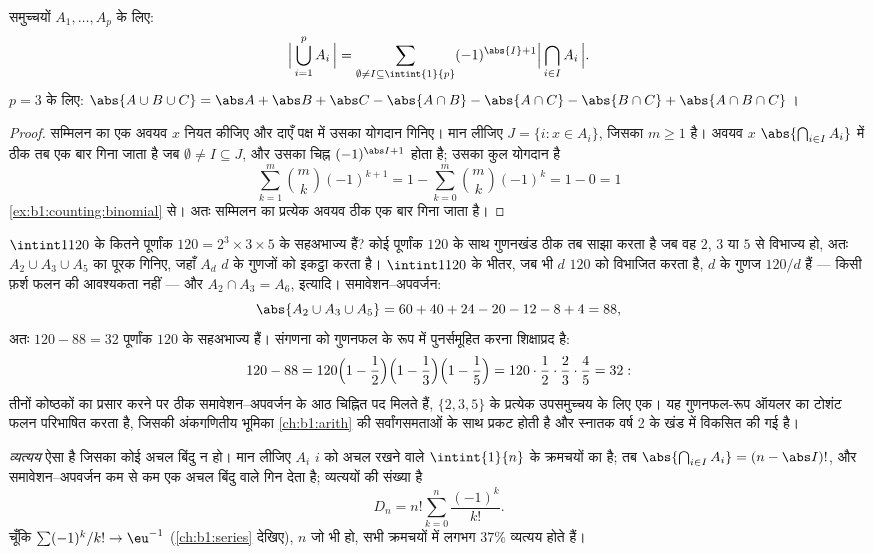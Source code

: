 \begin{theorem}[समावेशन--अपवर्जन]\label{thm:b1:counting:inclexcl}
 समुच्चयों $A_1, \dots, A_p$ के लिए:
\[
\Bigl|\, \bigcup_{i=1}^{p} A_i \,\Bigr|
= \sum_{\emptyset \neq I \subseteq \intint{1}{p}}
(-1)^{\abs{I}+1} \Bigl|\, \bigcap_{i \in I} A_i \,\Bigr| .
\]
$p = 3$ के लिए: $\abs{A \cup B \cup C} = \abs A + \abs B + \abs C - \abs{A
\cap B} - \abs{A \cap C} - \abs{B \cap C} + \abs{A \cap B \cap C}$।
\end{theorem}

\begin{proof}
सम्मिलन का एक अवयव $x$ नियत कीजिए और दाएँ पक्ष में उसका योगदान गिनिए। मान
लीजिए $J = \{i : x \in A_i\}$, जिसका  $m \geq 1$ है। अवयव $x$
$\abs{\bigcap_{i \in I} A_i}$ में ठीक तब एक बार गिना जाता है जब $\emptyset
\neq I \subseteq J$, और उसका चिह्न $(-1)^{\abs I + 1}$ होता है; उसका कुल
योगदान है
\[
\sum_{k=1}^{m} \binom{m}{k} (-1)^{k+1}
= 1 - \sum_{k=0}^{m} \binom mk (-1)^k = 1 - 0 = 1
\]
\cref{ex:b1:counting:binomial} से। अतः सम्मिलन का प्रत्येक अवयव ठीक एक बार
गिना जाता है।
\end{proof}

\begin{example}\label{ex:b1:counting:coprime}
$\intint1{120}$ के कितने पूर्णांक $120 = 2^3 \times 3 \times 5$ के सहअभाज्य
हैं? कोई पूर्णांक $120$ के साथ गुणनखंड ठीक तब साझा करता है जब वह $2$, $3$ या
$5$ से विभाज्य हो, अतः $A_2 \cup A_3 \cup A_5$ का पूरक गिनिए, जहाँ $A_d$ $d$
के गुणजों को इकट्ठा करता है। $\intint1{120}$ के भीतर, जब भी $d$ $120$ को
विभाजित करता है, $d$ के गुणज $120/d$ हैं --- किसी फ़र्श फलन की आवश्यकता नहीं
--- और $A_2 \cap A_3 = A_6$, इत्यादि। समावेशन--अपवर्जन:
\[
\abs{A_2 \cup A_3 \cup A_5}
= 60 + 40 + 24 - 20 - 12 - 8 + 4 = 88 ,
\]
अतः $120 - 88 = 32$ पूर्णांक $120$ के सहअभाज्य हैं। संगणना को गुणनफल के रूप
में पुनर्समूहित करना शिक्षाप्रद है:
\[
120 - 88 = 120\Bigl(1 - \frac12\Bigr)\Bigl(1 -
\frac13\Bigr)\Bigl(1 - \frac15\Bigr) = 120 \cdot \frac12 \cdot
\frac23 \cdot \frac45 = 32 :
\]
तीनों कोष्ठकों का प्रसार करने पर ठीक समावेशन--अपवर्जन के आठ चिह्नित पद मिलते
हैं, $\{2, 3, 5\}$ के प्रत्येक उपसमुच्चय के लिए एक। यह गुणनफल-रूप ऑयलर का
टोशंट फलन परिभाषित करता है, जिसकी अंकगणितीय भूमिका \cref{ch:b1:arith} की
सर्वांगसमताओं के साथ प्रकट होती है और स्नातक वर्ष 2 के खंड में विकसित की गई
है।
\end{example}

\begin{example}[व्यत्यय]\label{ex:b1:counting:derangement}
\emph{व्यत्यय} ऐसा  है जिसका कोई अचल बिंदु न हो। मान लीजिए $A_i$ $i$
को अचल रखने वाले $\intint{1}{n}$ के क्रमचयों का  है; तब
$\abs{\bigcap_{i \in I} A_i} = (n - \abs I)!$, और समावेशन--अपवर्जन कम से कम
एक अचल बिंदु वाले  गिन देता है; व्यत्ययों की संख्या है
\[
D_n = n! \sum_{k=0}^{n} \frac{(-1)^k}{k!} .
\]
चूँकि $\sum (-1)^k / k! \to \eu^{-1}$ (\cref{ch:b1:series} देखिए), $n$ जो भी
हो, सभी क्रमचयों में लगभग $37\%$ व्यत्यय होते हैं।
\end{example}

